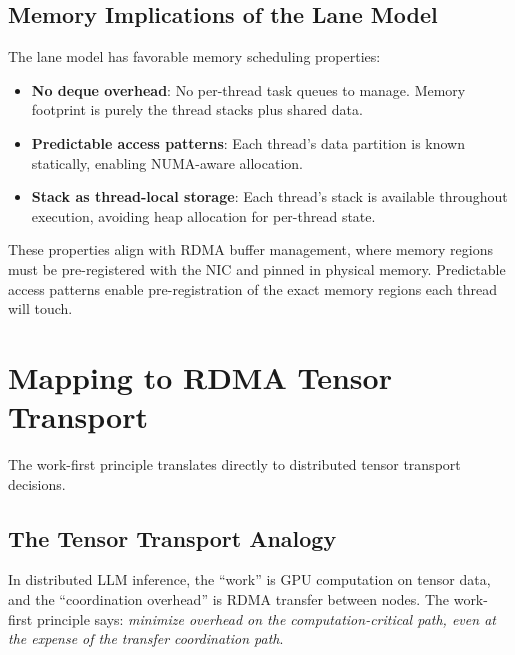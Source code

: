 \documentclass[11pt,letterpaper]{article}
\begin{document}
\subsection{Memory Implications of the Lane Model}

The lane model has favorable memory scheduling properties:

\begin{itemize}
    \item \textbf{No deque overhead}: No per-thread task queues to manage. Memory footprint is purely the thread stacks plus shared data.
    \item \textbf{Predictable access patterns}: Each thread's data partition is known statically, enabling NUMA-aware allocation.
    \item \textbf{Stack as thread-local storage}: Each thread's stack is available throughout execution, avoiding heap allocation for per-thread state.
\end{itemize}

These properties align with RDMA buffer management, where memory regions must be pre-registered with the NIC and pinned in physical memory. Predictable access patterns enable pre-registration of the exact memory regions each thread will touch.

\section{Mapping to RDMA Tensor Transport}
\label{sec:rdma}

The work-first principle translates directly to distributed tensor transport decisions.

\subsection{The Tensor Transport Analogy}

In distributed LLM inference, the ``work'' is GPU computation on tensor data, and the ``coordination overhead'' is RDMA transfer between nodes. The work-first principle says: \emph{minimize overhead on the computation-critical path, even at the expense of the transfer coordination path}.
\end{document}
